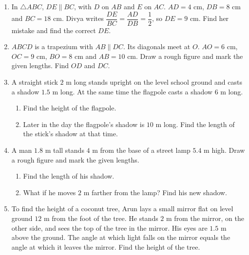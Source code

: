 \documentclass[11pt,a4paper]{article}
\theoremstyle{brand}
\theoremstyle{branddef}
\newcommand{\tr}{\triangle}
\newenvironment{exercise}[1]
  {\par\medskip\Needspace{7\baselineskip}\noindent{\large\bfseries\color{accent}Exercise #1}
   \par\smallskip
   \begin{enumerate}[leftmargin=*,itemsep=4pt]}
  {\end{enumerate}}
\newcommand{\ramark}[3]{\coordinate (ra1) at ($(#1)!2mm!(#2)$);\coordinate (ra2) at ($(#1)!2mm!(#3)$);\draw[thin] (ra1) -- ($(ra1)+(ra2)-(#1)$) -- (ra2);}
\begin{document}
\begin{exercise}{2H}
  \item In $\tr ABC$, $DE\parallel BC$, with $D$ on $AB$ and $E$ on $AC$. $AD=4$ cm, $DB=8$ cm and $BC=18$ cm. Divya writes $\dfrac{DE}{BC}=\dfrac{AD}{DB}=\dfrac12$, so $DE=9$ cm. Find her mistake and find the correct $DE$.
  \item $ABCD$ is a trapezium with $AB\parallel DC$. Its diagonals meet at $O$. $AO=6$ cm, $OC=9$ cm, $BO=8$ cm and $AB=10$ cm. Draw a rough figure and mark the given lengths. Find $OD$ and $DC$.
  \item A straight stick $2$ m long stands upright on the level school ground and casts a shadow $1.5$ m long. At the same time the flagpole casts a shadow $6$ m long.
  \begin{enumerate}[label=(\alph*),itemsep=1pt]
    \item Find the height of the flagpole.
    \item Later in the day the flagpole's shadow is $10$ m long. Find the length of the stick's shadow at that time.
  \end{enumerate}
  \item A man $1.8$ m tall stands $4$ m from the base of a street lamp $5.4$ m high. Draw a rough figure and mark the given lengths.
  \begin{enumerate}[label=(\alph*),itemsep=1pt]
    \item Find the length of his shadow.
    \item What if he moves $2$ m farther from the lamp? Find his new shadow.
  \end{enumerate}
  \item To find the height of a coconut tree, Arun lays a small mirror flat on level ground $12$ m from the foot of the tree. He stands $2$ m from the mirror, on the other side, and sees the top of the tree in the mirror. His eyes are $1.5$ m above the ground. The angle at which light falls on the mirror equals the angle at which it leaves the mirror. Find the height of the tree.
  \begin{center}
\end{center}
\end{exercise}
\end{document}
